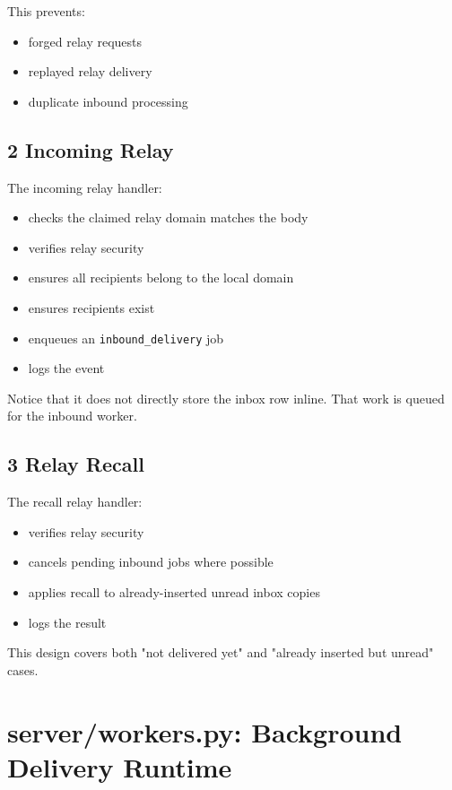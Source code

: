 \documentclass[11pt,a4paper]{article}
\begin{document}
This prevents:

\begin{itemize}
\item forged relay requests
\item replayed relay delivery
\item duplicate inbound processing
\end{itemize}

\subsection{2 Incoming Relay}

The incoming relay handler:

\begin{itemize}
\item checks the claimed relay domain matches the body
\item verifies relay security
\item ensures all recipients belong to the local domain
\item ensures recipients exist
\item enqueues an \nolinkurl{inbound_delivery} job
\item logs the event
\end{itemize}

Notice that it does not directly store the inbox row inline. That work is queued for the inbound worker.

\subsection{3 Relay Recall}

The recall relay handler:

\begin{itemize}
\item verifies relay security
\item cancels pending inbound jobs where possible
\item applies recall to already-inserted unread inbox copies
\item logs the result
\end{itemize}

This design covers both "not delivered yet" and "already inserted but unread" cases.


\section{server/workers.py: Background Delivery Runtime}
\end{document}
